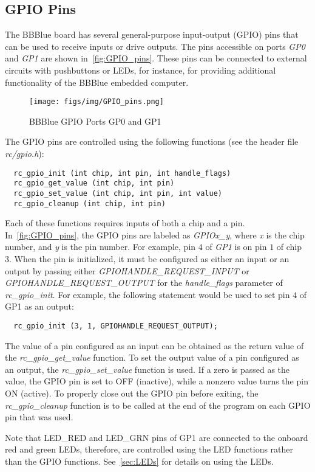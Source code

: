 \subsection{GPIO Pins}
\label{sec:GPIOPins}
The BBBlue board has several general-purpose input-output (GPIO) pins that can
be used to receive inputs or drive outputs. The pins accessible on ports
\emph{GP0} and \emph{GP1} are shown in~\autoref{fig:GPIO_pins}. These pins can
be connected to external circuits with pushbuttons or LEDs, for instance, for providing additional functionality of the BBBlue embedded computer. %
%
\begin{figure}[htbp]
  \centering
  \texttt{[image: figs/img/GPIO\_pins.png]}
  \caption{BBBlue GPIO Ports GP0 and GP1}
  \label{fig:GPIO_pins}
\end{figure}
%
The GPIO pins are controlled using the following functions (see the header file \emph{rc/gpio.h}): %
\begin{verbatim}
  rc_gpio_init (int chip, int pin, int handle_flags)
  rc_gpio_get_value (int chip, int pin)
  rc_gpio_set_value (int chip, int pin, int value)
  rc_gpio_cleanup (int chip, int pin)
\end{verbatim}
%
Each of these functions requires inputs of both a chip and a pin. In~\autoref{fig:GPIO_pins}, the GPIO pins are labeled as \emph{GPIOx\_y}, where \emph{x} is the chip number, and \emph{y} is the pin number. For example, pin $4$ of \emph{GP1} is on pin $1$ of chip $3.$ When the pin is initialized, it must be configured as either an input or an output by passing either \emph{GPIOHANDLE\_REQUEST\_INPUT} or \emph{GPIOHANDLE\_REQUEST\_OUTPUT} for the \emph{handle\_flags} parameter of \emph{rc\_gpio\_init}. For example, the following statement would be used to set pin $4$ of GP1 as an output: %
%
\begin{verbatim}
  rc_gpio_init (3, 1, GPIOHANDLE_REQUEST_OUTPUT);
\end{verbatim}
%
The value of a pin configured as an input can be obtained as the return value of the \emph{rc\_gpio\_get\_value} function. To set the output value of a pin configured as an output, the \emph{rc\_gpio\_set\_value} function is used. If a zero is passed as the value, the GPIO pin is set to OFF (inactive), while a nonzero value turns the pin ON (active). To properly close out the GPIO pin before exiting, the \emph{rc\_gpio\_cleanup} function is to be called at the end of the program on each GPIO pin that was used.

Note that LED\_RED and LED\_GRN pins of GP1 are connected to the onboard red and green LEDs, therefore, are controlled using the LED functions rather than the GPIO functions. See~\autoref{sec:LEDs} for details on using the LEDs.

